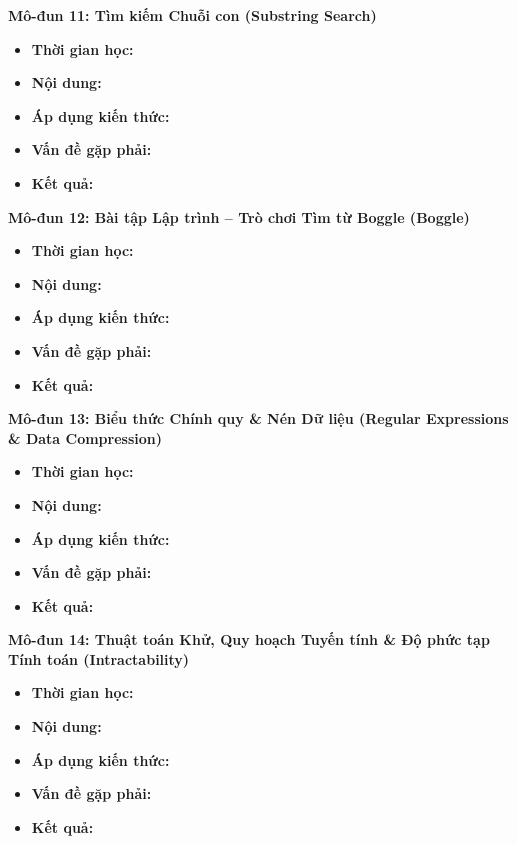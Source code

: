\documentclass[11pt, a4paper]{article}
\begin{document}
\vspace{0.15cm}

\noindent\textbf{Mô-đun 11: Tìm kiếm Chuỗi con (Substring Search)}
\begin{itemize}
    \item \textbf{Thời gian học:} 
    \item \textbf{Nội dung:} 
    \item \textbf{Áp dụng kiến thức:} 
    \item \textbf{Vấn đề gặp phải:} 
    \item \textbf{Kết quả:} 
\end{itemize}

\vspace{0.15cm}

\noindent\textbf{Mô-đun 12: Bài tập Lập trình -- Trò chơi Tìm từ Boggle (Boggle)}
\begin{itemize}
    \item \textbf{Thời gian học:} 
    \item \textbf{Nội dung:} 
    \item \textbf{Áp dụng kiến thức:} 
    \item \textbf{Vấn đề gặp phải:} 
    \item \textbf{Kết quả:} 
\end{itemize}

\vspace{0.15cm}

\noindent\textbf{Mô-đun 13: Biểu thức Chính quy \& Nén Dữ liệu (Regular Expressions \& Data Compression)}
\begin{itemize}
    \item \textbf{Thời gian học:} 
    \item \textbf{Nội dung:} 
    \item \textbf{Áp dụng kiến thức:} 
    \item \textbf{Vấn đề gặp phải:} 
    \item \textbf{Kết quả:} 
\end{itemize}

\vspace{0.15cm}

\noindent\textbf{Mô-đun 14: Thuật toán Khử, Quy hoạch Tuyến tính \& Độ phức tạp Tính toán (Intractability)}
\begin{itemize}
    \item \textbf{Thời gian học:} 
    \item \textbf{Nội dung:} 
    \item \textbf{Áp dụng kiến thức:} 
    \item \textbf{Vấn đề gặp phải:} 
    \item \textbf{Kết quả:} 
\end{itemize}
\end{document}
